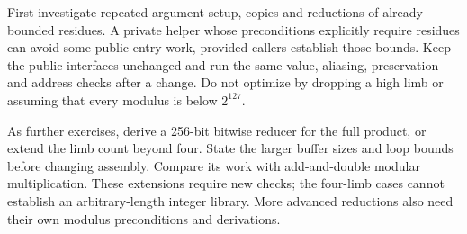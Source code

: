 First investigate repeated argument setup, copies and reductions of already bounded
residues. A private helper whose preconditions explicitly require residues can avoid
some public-entry work, provided callers establish those bounds. Keep the public
interfaces unchanged and run the same value, aliasing, preservation and address checks
after a change. Do not optimize by dropping a high limb or assuming that every modulus
is below \(2^{127}\).

As further exercises, derive a 256-bit bitwise reducer for the full product, or extend
the limb count beyond four. State the larger buffer sizes and loop bounds before
changing assembly. Compare its work with add-and-double modular multiplication. These
extensions require new checks; the four-limb cases cannot establish an arbitrary-length
integer library. More advanced reductions also need their own modulus preconditions
and derivations.
